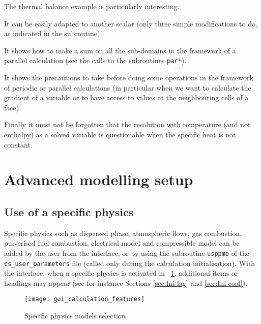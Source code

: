 {{{The thermal balance example is particularly interesting.
\begin{list}{-}{}
\item It can be easily adapted to another scalar (only three simple
      modifications to do, as indicated in the subroutine).
\item It shows how to make a sum on all the sub-domains in the framework
      of a parallel calculation (see the calls to the subroutines
      \texttt{par*}).
\item It shows the precautions to take before doing some operations in
      the framework of periodic or parallel calculations (in particular
      when we want to calculate the gradient of a variable or to have
      access to values at the neighbouring cells of a face).
\item Finally it must not be forgotten that the resolution with
      temperature (and not enthalpy) as a solved variable is questionable when the specific
      heat is not constant.
\end{list}

\section{Advanced modelling setup}

\subsection{Use of a specific physics}
\label{sec:prg_usppmo}%
Specific physics such as dispersed phase, atmospheric flows, gas combustion,
pulverised fuel combustion, electrical model and compressible model can be
added by the user from the interface, or by using the subroutine \texttt{usppmo} of
the \texttt{cs\_user\_parameters} file (called only during the calculation initialisation).
With the interface, when a specific physics is activated in \figurename~\ref{fig:5_GUI},
additional items or headings may appear (see for instance Sections \ref{sec:Ini-lag}
and \ref{sec:Ini-coal}).

\begin{figure}[!ht]
\begin{center}
\texttt{[image: gui\_calculation\_features]}
\caption{Specific physics models selection}
\label{fig:5_GUI}
\end{center}
\end{figure}

}}}
